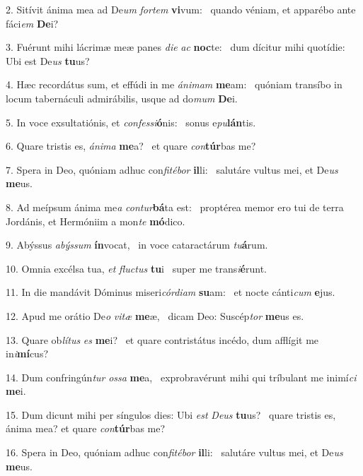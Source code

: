 2. Sitívit ánima mea ad De\textit{um} \textit{for}\textit{tem} \textbf{vi}vum: \ast\  quando véniam, et apparébo ante fáci\textit{em} \textbf{De}i?\

3. Fuérunt mihi lácrimæ meæ panes \textit{di}\textit{e} \textit{ac} \textbf{noc}te: \ast\  dum dícitur mihi quotídie: Ubi est De\textit{us} \textbf{tu}us?\

4. Hæc recordátus sum, et effúdi in me \textit{á}\textit{ni}\textit{mam} \textbf{me}am: \ast\  quóniam transíbo in locum tabernáculi admirábilis, usque ad do\textit{mum} \textbf{De}i.\

5. In voce exsultatiónis, et \textit{con}\textit{fes}\textit{si}\textbf{ó}nis: \ast\  sonus e\textit{pu}\textbf{lán}tis.\

6. Quare tristis es, \textit{á}\textit{ni}\textit{ma} \textbf{me}a? \ast\  et quare \textit{con}\textbf{túr}bas me?\

7. Spera in Deo, quóniam adhuc con\textit{fi}\textit{té}\textit{bor} \textbf{il}li: \ast\  salutáre vultus mei, et De\textit{us} \textbf{me}us.\

8. Ad meípsum ánima me\textit{a} \textit{con}\textit{tur}\textbf{bá}ta est: \ast\  proptérea memor ero tui de terra Jordánis, et Hermóniim a mon\textit{te} \textbf{mó}dico.\

9. Abýssus \textit{a}\textit{býs}\textit{sum} \textbf{ín}vocat, \ast\  in voce cataractárum \textit{tu}\textbf{á}rum.\

10. Omnia excélsa tua, \textit{et} \textit{fluc}\textit{tus} \textbf{tu}i \ast\  super me trans\textit{i}\textbf{é}runt.\

11. In die mandávit Dóminus miseri\textit{cór}\textit{di}\textit{am} \textbf{su}am: \ast\  et nocte cánti\textit{cum} \textbf{e}jus.\

12. Apud me orátio De\textit{o} \textit{vi}\textit{tæ} \textbf{me}æ, \ast\  dicam Deo: Suscép\textit{tor} \textbf{me}us es.\

13. Quare ob\textit{lí}\textit{tus} \textit{es} \textbf{me}i? \ast\  et quare contristátus incédo, dum afflígit me in\textit{i}\textbf{mí}cus?\

14. Dum confringún\textit{tur} \textit{os}\textit{sa} \textbf{me}a, \ast\  exprobravérunt mihi qui tríbulant me inimí\textit{ci} \textbf{me}i.\

15. Dum dicunt mihi per síngulos dies: Ubi \textit{est} \textit{De}\textit{us} \textbf{tu}us? \ast\  quare tristis es, ánima mea? et quare \textit{con}\textbf{túr}bas me?\

16. Spera in Deo, quóniam adhuc con\textit{fi}\textit{té}\textit{bor} \textbf{il}li: \ast\  salutáre vultus mei, et De\textit{us} \textbf{me}us.\

